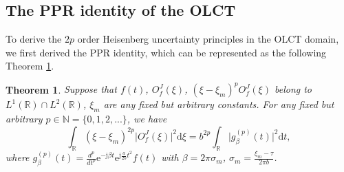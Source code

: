 \documentclass[preprint,12pt]{elsarticle}
\newtheorem{thm}{Theorem}
\begin{document}
\subsection{The PPR identity of the OLCT}
To derive the $2p$ order Heisenberg uncertainty principles in the OLCT domain, we first derived the PPR identity, which can be represented as the following Theorem \ref{thm3.1}.
\begin{thm}
	\label{thm3.1}
	Suppose that $f(t)$, $O_f^J(\xi)$, $(\xi-\xi_m)^p O_f^J(\xi)$ belong to $L^1(\mathbb{R}) \cap L^2(\mathbb{R})$, $\xi_m$ are any fixed but arbitrary constants. For any fixed but arbitrary $p \in \mathbb{N} = \{0,1,2,...\}$, we have
	\begin{equation}
	\label{14}
	\int_{\mathbb{R}} (\xi-\xi_m)^{2p} \lvert O_f^J(\xi) \rvert^2 \mathrm{d} \xi = b^{2p} \int_{\mathbb{R}} \lvert g_\beta^{(p)}(t) \rvert^2 \mathrm{d}t,
	\end{equation}
	where $g_{\beta}^{(p)}(t) = \frac{d^p}{dt^p} \mathrm{e}^{-\mathrm{j} \beta t} \mathrm{e}^{\mathrm{j} \frac{a}{2b} t^2}  f(t)$ with $\beta=2 \pi \sigma_m$, $\sigma_m = \frac{\xi_m-\tau}{2 \pi b}$. %
\end{thm}
\end{document}
